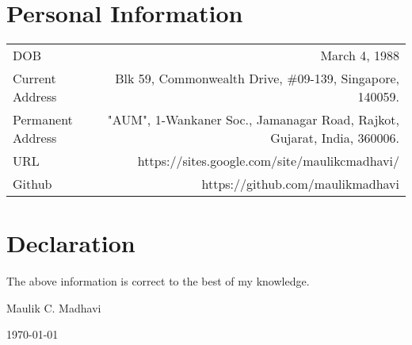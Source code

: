 \documentclass[10pt]{article}
\begin{document}
\section*{Personal Information}
\begin{tabular}{L!{\VRule}R}
	DOB&March 4, 1988\vspace{0.1cm}\\
	Current Address&Blk 59, Commonwealth Drive, \#09-139, Singapore, 140059.\vspace{0.1cm}\\
	Permanent Address&"AUM", 1-Wankaner Soc., Jamanagar Road, Rajkot, Gujarat, India, 360006.\vspace{0.1cm}\\
	URL&https://sites.google.com/site/maulikcmadhavi/\\
Github&https://github.com/maulikmadhavi\\
\end{tabular} 

\section*{Declaration}
 The above information is correct to the best of my knowledge.
 
\vspace{2cm}
\begin{normalsize}
	\raggedleft
	Maulik C. Madhavi\\
\end{normalsize}
\begin{normalsize}
	\raggedleft	\today	\\
\end{normalsize}
\end{document}
